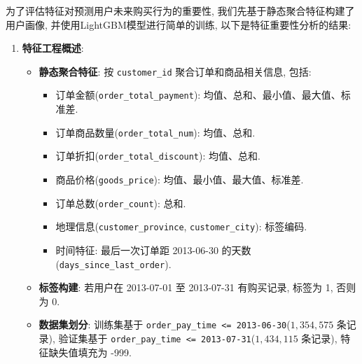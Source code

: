 \documentclass[11pt, a4paper]{article}
\begin{document}
为了评估特征对预测用户未来购买行为的重要性, 我们先基于静态聚合特征构建了用户画像, 并使用LightGBM模型进行简单的训练, 以下是特征重要性分析的结果:

\begin{enumerate}
    \item \textbf{特征工程概述}:
    \begin{itemize}
        \item \textbf{静态聚合特征}: 按 \texttt{customer\_id} 聚合订单和商品相关信息, 包括:
        \begin{itemize}
            \item 订单金额(\texttt{order\_total\_payment}): 均值、总和、最小值、最大值、标准差.
            \item 订单商品数量(\texttt{order\_total\_num}): 均值、总和.
            \item 订单折扣(\texttt{order\_total\_discount}): 均值、总和.
            \item 商品价格(\texttt{goods\_price}): 均值、最小值、最大值、标准差.
            \item 订单总数(\texttt{order\_count}): 总和.
            \item 地理信息(\texttt{customer\_province}, \texttt{customer\_city}): 标签编码.
            \item 时间特征: 最后一次订单距 2013-06-30 的天数(\texttt{days\_since\_last\_order}).
        \end{itemize}
        \item \textbf{标签构建}: 若用户在 2013-07-01 至 2013-07-31 有购买记录, 标签为 1, 否则为 0.
        \item \textbf{数据集划分}: 训练集基于 \texttt{order\_pay\_time <= 2013-06-30}($1,354,575$ 条记录), 验证集基于 \texttt{order\_pay\_time <= 2013-07-31}($1,434,115$ 条记录), 特征缺失值填充为 -999.
    \end{itemize}


\end{enumerate}
\end{document}
